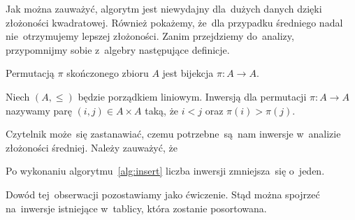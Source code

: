 Jak można zauważyć, algorytm jest niewydajny dla~dużych
danych dzięki złożoności kwadratowej. Również pokażemy,
że~dla przypadku średniego nadal nie~otrzymujemy
lepszej złożoności. Zanim przejdziemy do~analizy,
przypomnijmy sobie z~algebry następujące definicje.

\begin{definition}
    Permutacją \( \pi \) skończonego zbioru \( A \)
    jest bijekcja \( \pi : A \to A \).
\end{definition}

\begin{definition}
    Niech \( (A, \le) \) będzie porządkiem liniowym.
    Inwersją dla permutacji \( \pi : A \to A \) 
    nazywamy parę \( (i, j) \in A \times A \)
    taką, że \( i < j \) oraz \( \pi(i) > \pi(j) \).
\end{definition}

Czytelnik może~się zastanawiać, czemu potrzebne~są~nam 
inwersje w~analizie złożoności średniej.
Należy zauważyć, że 
\begin{observation}
    Po wykonaniu algorytmu~\ref{alg:insert} 
    liczba inwersji zmniejsza~się o~jeden.
\end{observation}      
Dowód tej~obserwacji pozostawiamy jako ćwiczenie.
Stąd można spojrzeć na~inwersje istniejące w~tablicy,
która zostanie posortowana.

